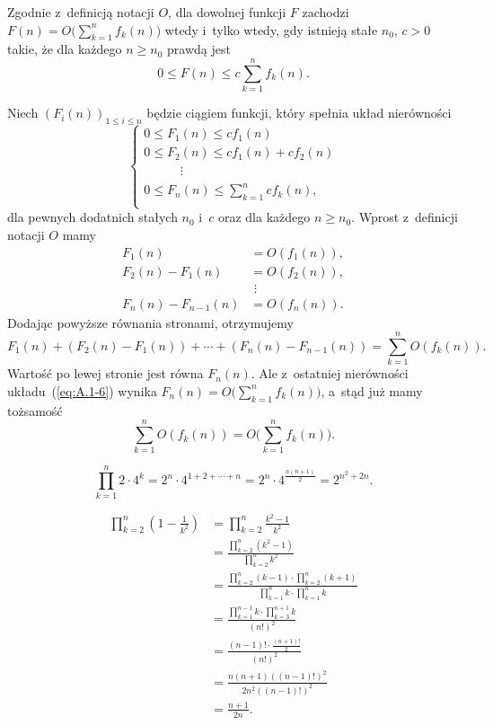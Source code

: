 \exercise %
Zgodnie z~definicją notacji $O$, dla dowolnej funkcji $F$ zachodzi $F(n) = O\bigl(\sum_{k=1}^nf_k(n)\bigr)$ wtedy i~tylko wtedy, gdy istnieją stałe $n_0$, $c>0$ takie, że dla każdego $n\ge n_0$ prawdą jest
\[
	0\le F(n)\le c\sum_{k=1}^n f_k(n).
\]

Niech $(F_i(n))_{1\le i\le n}$ będzie ciągiem funkcji, który spełnia układ nierówności
\begin{equation}
	\begin{cases}
		0 \le F_1(n) \le cf_1(n) \\
		0 \le F_2(n) \le cf_1(n)+cf_2(n) \\
		\phantom{0 \le F_2} \vdots \\
		0 \le F_n(n) \le \sum_{k=1}^ncf_k(n), \\
	\end{cases} \label{eq:A.1-6}
\end{equation}
dla pewnych dodatnich stałych $n_0$ i~$c$ oraz dla każdego $n\ge n_0$. Wprost z~definicji notacji $O$ mamy
\begin{align*}
	F_1(n) &= O(f_1(n)), \\
	F_2(n)-F_1(n) &= O(f_2(n)), \\
	& \,\,\vdots \\
	F_n(n)-F_{n-1}(n) &= O(f_n(n)).
\end{align*}
Dodając powyższe równania stronami, otrzymujemy
\[
	F_1(n)+(F_2(n)-F_1(n))+\cdots+(F_n(n)-F_{n-1}(n)) = \sum_{k=1}^nO(f_k(n)).
\]
Wartość po lewej stronie jest równa $F_n(n)$. Ale z~ostatniej nierówności układu~(\ref{eq:A.1-6}) wynika $F_n(n)=O\bigl(\sum_{k=1}^nf_k(n)\bigr)$, a~stąd już mamy tożsamość
\[
	\sum_{k=1}^nO(f_k(n)) = O\biggl(\sum_{k=1}^nf_k(n)\biggr).
\]

\exercise %
\[
	\prod_{k=1}^n2\cdot 4^k = 2^n\cdot 4^{1+2+\cdots+n} = 2^n\cdot 4^{\frac{n(n+1)}{2}} = 2^{n^2\!+2n}.
\]

\exercise %
\begin{align*}
	\prod_{k=2}^n\left(1-\frac{1}{k^2}\right) &= \prod_{k=2}^n\frac{k^2-1}{k^2} \\[2mm]
	&= \frac{\prod_{k=2}^n(k^2-1)}{\prod_{k=2}^nk^2} \\[2mm]
	&= \frac{\prod_{k=2}^n(k-1)\cdot\prod_{k=2}^n(k+1)}{\prod_{k=1}^nk\cdot\prod_{k=1}^nk} \\[2mm]
	&= \frac{\prod_{k=1}^{n-1}k\cdot\prod_{k=3}^{n+1}k}{(n!)^2} \\[2mm]
	&= \frac{(n-1)!\cdot\frac{(n+1)!}{2}}{(n!)^2} \\[2mm]
	&= \frac{n(n+1)((n-1)!)^2}{2n^2((n-1)!)^2} \\[2mm]
	&= \frac{n+1}{2n}.
\end{align*}

